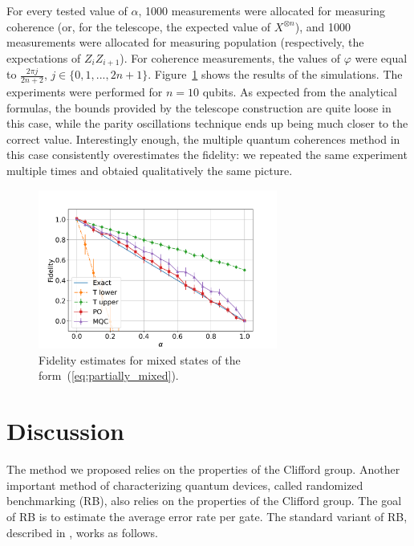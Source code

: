 For every tested value of $\alpha$, 1000 measurements were allocated for measuring coherence (or, for the telescope, the expected value of $X^{\otimes n}$), and 1000 measurements were allocated for measuring population (respectively, the expectations of $Z_i Z_{i+1}$). For coherence measurements, the values of $\varphi$ were equal to $\frac{2 \pi j}{2 n + 2}$, $j \in \{0, 1, ..., 2n+1\}$.
Figure~\ref{fig:fidelity_depo} shows the results of the simulations. The experiments were performed for $n=10$ qubits. As expected from the analytical formulas, the bounds provided by the telescope construction are quite loose in this case, while the parity oscillations technique ends up being much closer to the correct value. Interestingly enough, the multiple quantum coherences method in this case consistently overestimates the fidelity: we repeated the same experiment multiple times and obtaied qualitatively the same picture.

\begin{figure}
    \centering
    \includegraphics[width=0.7\textwidth]{figures/depolarizing_fidelities_nq_10_shz_1000_shx_1000_amax_1}
    \caption{Fidelity estimates for mixed states of the form~(\ref{eq:partially_mixed}).}
    \label{fig:fidelity_depo}
\end{figure}

\section{Discussion}

The method we proposed relies on the properties of the Clifford group. Another important method of characterizing quantum devices, called randomized benchmarking (RB), also relies on the properties of the Clifford group. The goal of RB is to estimate the average error rate per gate. The standard variant of RB, described in \cite{magesan_robust_2011-1}, works as follows. 

